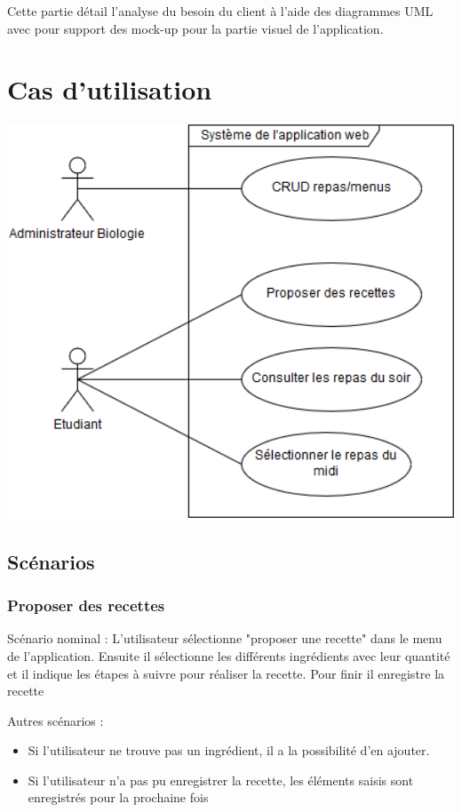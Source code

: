 Cette partie détail l'analyse du besoin du client à l'aide des diagrammes UML avec pour support des mock-up pour la partie visuel de l'application.

\section{Cas d'utilisation}



\centerline{\includegraphics[width=14cm]{images/UseCase.png}}



\subsection{Scénarios}

\subsubsection{Proposer des recettes} 

Scénario nominal :
L'utilisateur sélectionne "proposer une recette" dans le menu de l'application. Ensuite il sélectionne les différents ingrédients avec leur quantité et il indique les étapes à suivre pour réaliser la recette. Pour finir il enregistre la recette

Autres scénarios :
\begin{itemize}
\item Si l'utilisateur ne trouve pas un ingrédient, il a la possibilité d'en ajouter.
\item Si l'utilisateur n'a pas pu enregistrer la recette, les éléments saisis sont enregistrés pour la prochaine fois
\end{itemize}


